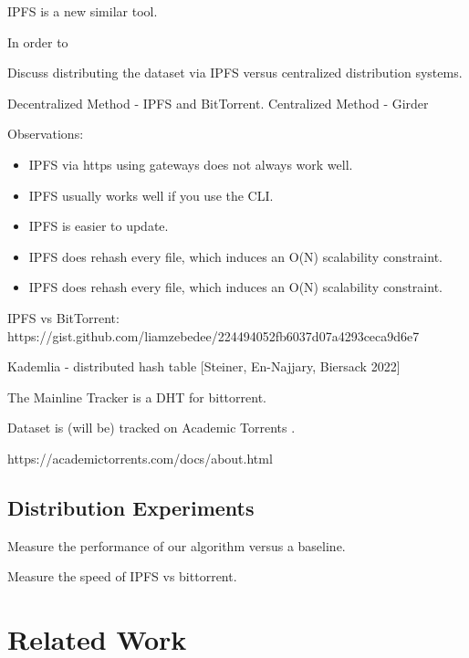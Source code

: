 \documentclass[10pt,twocolumn,letterpaper]{article}
\begin{document}
IPFS is a new similar tool.




In order to 

Discuss distributing the dataset via IPFS versus centralized distribution
systems.

Decentralized Method - IPFS and BitTorrent.
Centralized Method - Girder

Observations:
\begin{itemize}
    \item IPFS via https using gateways does not always work well.
    \item IPFS usually works well if you use the CLI.
    \item IPFS is easier to update.
    \item IPFS does rehash every file, which induces an O(N) scalability constraint.
    \item IPFS does rehash every file, which induces an O(N) scalability constraint.
\end{itemize}


IPFS vs BitTorrent:
https://gist.github.com/liamzebedee/224494052fb6037d07a4293ceca9d6e7

Kademlia - distributed hash table [Steiner, En-Najjary, Biersack 2022]

The Mainline Tracker is a DHT for bittorrent.



Dataset is (will be) tracked on Academic Torrents \cite{academic_torrents_Cohen2014}.

https://academictorrents.com/docs/about.html


\subsection{Distribution Experiments}

Measure the performance of our algorithm versus a baseline.

Measure the speed of IPFS vs bittorrent.

\section{Related Work}
\end{document}
